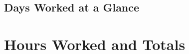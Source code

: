 
\usepackage{adjustbox}

 
\begin{center}
\section*{Days Worked at a Glance}
\MonthCalendar 
\end{center}
\section*{Hours Worked and Totals}
\hfill
{}


